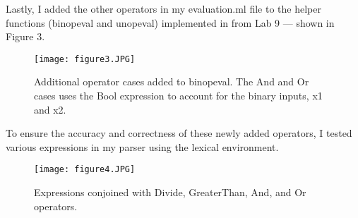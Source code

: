 \documentclass[answers]{exam}
\begin{document}
\noindent Lastly, I added the other operators in my evaluation.ml file to the helper functions (binopeval and unopeval) implemented in from Lab 9 — shown in Figure 3. 

\begin{figure}[!h]
	\centering
	\texttt{[image: figure3.JPG]}
	\caption{Additional operator cases added to binopeval. The And and Or cases uses the Bool expression to account for the binary inputs, x1 and x2. }
	\label{kalman}
\end{figure}

\noindent To ensure the accuracy and correctness of these newly added operators, I tested various expressions in my parser using the lexical environment. 
\begin{figure}[!h]
	\centering
	\texttt{[image: figure4.JPG]}
	\caption{Expressions conjoined with Divide, GreaterThan, And, and Or operators.}
	\label{kalman}
\end{figure}
\end{document}
